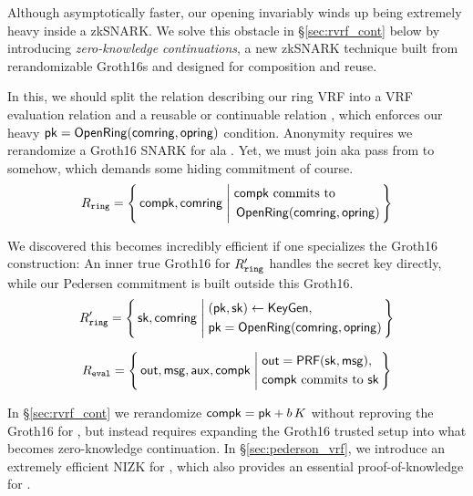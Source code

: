 Although asymptotically faster, our opening \OpenRing invariably
winds up being extremely heavy inside a zkSNARK.
We solve this obstacle in \S\ref{sec:rvrf_cont} below by introducing
{\em zero-knowledge continuations}, a new zkSNARK technique built from
rerandomizable Groth16s \cite{Groth16} and designed for composition and reuse.

In this, we should split the relation describing our ring VRF into
a VRF evaluation relation \Leval and a reusable or continuable relation
\Lring, which enforces our heavy $\mathsf{pk} = {\mathsf{OpenRing}}(\mathsf{comring},\mathsf{opring})$
condition.  Anonymity requires we rerandomize a Groth16 SNARK for \Lring
ala \cite[Theorem 3, Appendix C, pp. 31]{RandomizationGroth16}.
%
Yet, we must join aka pass \pk from \Lring to \Leval somehow, which
demands some hiding commitment \compk of course.
%
\def\tmpAA{\textrm{\compk commits to\ }}
\def\tmpBB{\OpenRing(\comring,\openring)}
$$ \Lring = \Setst{ \compk, \comring }{
	\eprint{
	\tmpAA \pk = \tmpBB
	}{
    \begin{aligned}
	&\tmpAA \\
	&\, \tmpBB \\
    \end{aligned}
	}
} $$

We discovered this becomes incredibly efficient if one specializes
the Groth16 construction:  An inner true Groth16 for $R_{\mathtt{ring}}'$ handles
the secret key \sk directly, while our Pedersen commitment \compk is
built outside this Groth16.
$$ \Lring' = \Setst{ \sk, \comring}{
    \eprint{
    (\pk,\sk) \leftarrow \KeyGen, \quad %
    \pk = \OpenRing(\comring,\openring) 
    }{
    \begin{aligned}
        &(\pk,\sk) \leftarrow \KeyGen, \\
        &\pk = \OpenRing(\comring,\openring)  \\      
    \end{aligned}
    }
} $$

$$ \Leval = \Setst{ \Out, \msg, \aux, \compk }{
    \begin{aligned}
	&\Out = \PRF(\sk,\msg), \\
	&\textrm{\compk commits to\ \sk} \\
    \end{aligned}
} $$

In \S\ref{sec:rvrf_cont} we rerandomize $\mathsf{compk} = \mathsf{pk} + b \, K$
without reproving the Groth16 for \Lring, but instead requires
expanding the Groth16 trusted setup into what becomes zero-knowledge continuation.
%
In \S\ref{sec:pederson_vrf}, we introduce an extremely efficient NIZK
for \Leval, which also provides an essential proof-of-knowledge for \compk.


